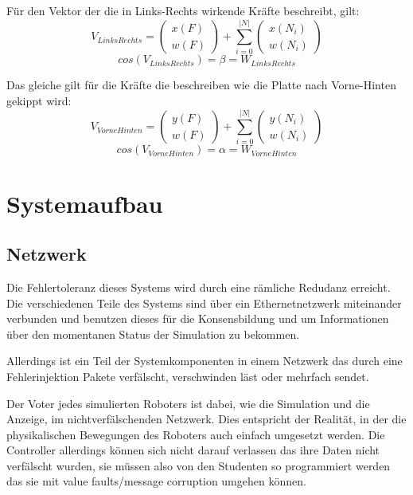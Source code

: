\documentclass[
    12pt,
    bibliography=totoc,
    ngerman
]{scrartcl}
\begin{document}
F{\"{u}}r den Vektor der die in Links-Rechts wirkende Kr{\"{a}}fte beschreibt, gilt:
$$ V_{LinksRechts} = \begin{pmatrix}x(F) \\ w(F) \end{pmatrix} + \sum_{i=0}^{|N|} \begin{pmatrix} x(N_i) \\ w(N_i) \end{pmatrix} $$
$$ cos(V_{LinksRechts}) = \beta = W_{LinksRechts} $$

Das gleiche gilt f{\"{u}}r die Kr{\"{a}}fte die beschreiben wie die Platte nach Vorne-Hinten gekippt wird:
$$ V_{VorneHinten} = \begin{pmatrix}y(F) \\ w(F) \end{pmatrix} + \sum_{i=0}^{|N|} \begin{pmatrix} y(N_i) \\ w(N_i) \end{pmatrix} $$
$$ cos(V_{VorneHinten}) = \alpha = W_{VorneHinten} $$

\clearpage
\section{Systemaufbau}

\subsection{Netzwerk}\label{network}
Die Fehlertoleranz dieses Systems wird durch eine r{\"{a}}mliche Redudanz erreicht. Die verschiedenen Teile des Systems sind {\"{u}}ber ein Ethernetnetzwerk miteinander verbunden und benutzen dieses
f{\"{u}}r die Konsensbildung und um Informationen {\"{u}}ber den momentanen Status der Simulation zu bekommen.

Allerdings ist ein Teil der Systemkomponenten in einem Netzwerk das durch eine Fehlerinjektion Pakete verf{\"{a}}lscht, verschwinden l{\"{a}}st oder mehrfach sendet. 

Der Voter jedes simulierten Roboters ist dabei, wie die Simulation und die Anzeige, im nichtverf{\"{a}}lschenden Netzwerk. Dies entspricht der Realit{\"{a}}t, in der die physikalischen Bewegungen
des Roboters auch einfach umgesetzt werden. Die Controller allerdings k{\"{o}}nnen sich nicht darauf verlassen das ihre Daten nicht verf{\"{a}}lscht wurden, sie m{\"{u}}ssen also von den Studenten so
programmiert werden das sie mit value faults/message corruption\cite{richling-ass} umgehen k{\"{o}}nnen.
\end{document}
